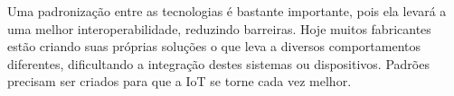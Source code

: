 Uma padronização entre as tecnologias é bastante importante, pois ela levará a uma melhor interoperabilidade, reduzindo barreiras. Hoje muitos fabricantes estão criando suas próprias soluções o que leva a diversos comportamentos diferentes, dificultando a integração destes sistemas ou dispositivos. Padrões precisam ser criados para que a IoT se torne cada vez melhor.